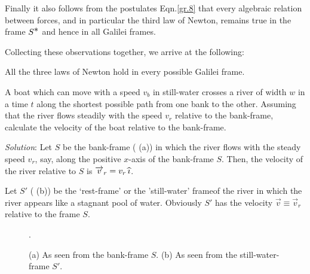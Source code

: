Finally it also follows from the postulates 
Eqn.\eqref{gr.8} that every algebraic relation between 
forces, and in particular the third law of Newton, remains 
true in the frame $S^{\textstyle \ast}$ and hence in all Galilei frames.

Collecting these observations together, we arrive at the 
following:

\thm All the three laws of Newton hold in every 
possible Galilei frame.

\exm A boat which can move with a speed $v_b$ in 
still-water crosses a river of width $w$ in a time $t$ 
along the shortest possible path from one bank to the 
other. Assuming that the river flows steadily with the 
speed $v_r$ relative to the bank-frame, calculate the  
velocity of the boat relative to the bank-frame.

\textsl{Solution}: Let $S$ be the bank-frame  
( (a)) in which the river flows with the 
steady speed $v_r$, say, along the positive $x$-axis of 
the bank-frame $S$. Then, the velocity of the river 
relative to $S$ is $\overrightarrow{v}_r = v_r\,{\widehat{\imath}}$. 

Let $S'$  ( (b)) be the `rest-frame' or 
the 'still-water' frameof the river in which the river 
appears like a stagnant pool of water. Obviously $S'$ 
has the velocity $\vec{v} \equiv \vec{v}_r$ relative to 
the frame $S$. 

\begin{figure}[H]
\centering
{}
\caption{(a) As seen from the bank-frame $S$. (b) As 
seen from the still-water-frame $S'$.}
\label{fig1.2}. 
\end{figure}


